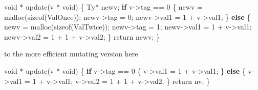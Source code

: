 \documentclass[
]{article}
\newenvironment{Shaded}{}{}
\newcommand{\DataTypeTok}[1]{\textcolor[rgb]{0.56,0.13,0.00}{#1}}
\newcommand{\DecValTok}[1]{\textcolor[rgb]{0.25,0.63,0.44}{#1}}
\newcommand{\FunctionTok}[1]{\textcolor[rgb]{0.02,0.16,0.49}{#1}}
\newcommand{\KeywordTok}[1]{\textcolor[rgb]{0.00,0.44,0.13}{\textbf{#1}}}
\newcommand{\NormalTok}[1]{#1}
\newcommand{\OperatorTok}[1]{\textcolor[rgb]{0.40,0.40,0.40}{#1}}
\newcommand{\OtherTok}[1]{\textcolor[rgb]{0.00,0.44,0.13}{#1}}
\begin{document}
\begin{Shaded}
\begin{Highlighting}[]
\NormalTok{void }\OperatorTok{*}\NormalTok{ update(v }\OperatorTok{*}\NormalTok{ void) \{}
    \DataTypeTok{Ty}\OperatorTok{*}\NormalTok{ newv;}
    \KeywordTok{if}\NormalTok{ v}\OtherTok{{-}\textgreater{}}\NormalTok{tag }\OperatorTok{==} \DecValTok{0}\NormalTok{ \{}
\NormalTok{        newv }\OtherTok{=}\NormalTok{ malloc(sizeof(}\DataTypeTok{ValOnce}\NormalTok{));}
\NormalTok{        newv}\OtherTok{{-}\textgreater{}}\NormalTok{tag }\OtherTok{=} \DecValTok{0}\NormalTok{;}
\NormalTok{        newv}\OtherTok{{-}\textgreater{}}\NormalTok{val1 }\OtherTok{=} \DecValTok{1} \OperatorTok{+}\NormalTok{ v}\OtherTok{{-}\textgreater{}}\NormalTok{val1;}
\NormalTok{    \} }\KeywordTok{else}\NormalTok{ \{}
\NormalTok{        newv }\OtherTok{=}\NormalTok{ malloc(sizeof(}\DataTypeTok{ValTwice}\NormalTok{));}
\NormalTok{        newv}\OtherTok{{-}\textgreater{}}\NormalTok{tag }\OtherTok{=} \DecValTok{1}\NormalTok{;}
\NormalTok{        newv}\OtherTok{{-}\textgreater{}}\NormalTok{val1 }\OtherTok{=} \DecValTok{1} \OperatorTok{+}\NormalTok{ v}\OtherTok{{-}\textgreater{}}\NormalTok{val1;}
\NormalTok{        newv}\OtherTok{{-}\textgreater{}}\NormalTok{val2 }\OtherTok{=} \DecValTok{1} \OperatorTok{+} \DecValTok{1} \OperatorTok{+}\NormalTok{ v}\OtherTok{{-}\textgreater{}}\NormalTok{val2;}
\NormalTok{    \}}
    \FunctionTok{return}\NormalTok{ newv;}
\NormalTok{\}}
\end{Highlighting}
\end{Shaded}

to the more efficient mutating version here

\begin{Shaded}
\begin{Highlighting}[]
\NormalTok{void }\OperatorTok{*}\NormalTok{ update(v }\OperatorTok{*}\NormalTok{ void) \{}
    \KeywordTok{if}\NormalTok{ v}\OtherTok{{-}\textgreater{}}\NormalTok{tag }\OperatorTok{==} \DecValTok{0}\NormalTok{ \{}
\NormalTok{        v}\OtherTok{{-}\textgreater{}}\NormalTok{val1 }\OtherTok{=} \DecValTok{1} \OperatorTok{+}\NormalTok{ v}\OtherTok{{-}\textgreater{}}\NormalTok{val1;}
\NormalTok{    \} }\KeywordTok{else}\NormalTok{ \{}
\NormalTok{        v}\OtherTok{{-}\textgreater{}}\NormalTok{val1 }\OtherTok{=} \DecValTok{1} \OperatorTok{+}\NormalTok{ v}\OtherTok{{-}\textgreater{}}\NormalTok{val1;}
\NormalTok{        v}\OtherTok{{-}\textgreater{}}\NormalTok{val2 }\OtherTok{=} \DecValTok{1} \OperatorTok{+} \DecValTok{1} \OperatorTok{+}\NormalTok{ v}\OtherTok{{-}\textgreater{}}\NormalTok{val2;}
\NormalTok{    \}}
    \FunctionTok{return}\NormalTok{ nv;}
\NormalTok{\}}
\end{Highlighting}
\end{Shaded}
\end{document}
